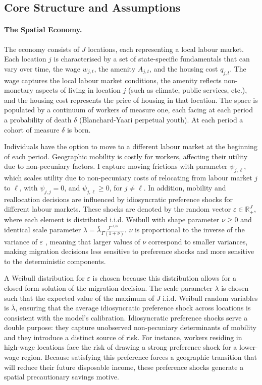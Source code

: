 \documentclass[12pt, a4paper]{article}
\begin{document}
\subsection{Core Structure and Assumptions}
\paragraph{The Spatial Economy.} The economy consists of $J$ locations, each representing a local labour market. Each location $j$ is characterised by a set of state-specific fundamentals that can vary over time, the wage $w_{j,t}$, the amenity $A_{j,t}$, and the housing cost $q_{j,t}$. The wage captures the local labour market conditions, the amenity reflects non-monetary aspects of living in location $j$ (such as climate, public services, etc.), and the housing cost represents the price of housing in that location. The space is populated by a continuum of workers of measure one, each facing at each period a probability of death $\delta$ (Blanchard-Yaari perpetual youth). At each period a cohort of measure $\delta$ is born. 

Individuals have the option to move to a different labour market at the beginning of each period. Geographic mobility is costly for workers, affecting their utility due to non-pecuniary factors. I capture moving frictions with parameter $\psi_{j,\ell}$, which scales utility due to non-pecuniary costs of relocating from labour market $j$ to $\ell$, with  $\psi_{j,j} = 0$, and  $\psi_{j,\ell} \geq 0$, for $j \neq \ell$. In addition, mobility and reallocation decisions are influenced by idiosyncratic preference shocks for different labour markets. These shocks are denoted by the random vector $\varepsilon \in \mathbb{R}^J_+$, where each element is distributed i.i.d. Weibull with shape parameter $\nu \geq 0$ and identical scale parameter $\lambda = \bar{\lambda}\frac{J^{-1/\nu}}{\Gamma(1+\nu)}$. $\nu$ is proportional to the inverse of the variance of $\varepsilon$ , meaning that larger values of $\nu$ correspond to smaller variances, making migration decisions less sensitive to preference shocks and more sensitive to the deterministic components.

A Weibull distribution for $\varepsilon$ is chosen because this distribution allows for a closed-form solution of the migration decision. The scale parameter $\lambda$ is chosen such that the expected value of the maximum of $J$ i.i.d. Weibull random variables is $\bar{\lambda}$, ensuring that the average idiosyncratic preference shock across locations is consistent with the model's calibration. Idiosyncratic preference shocks serve a double purpose: they capture unobserved non-pecuniary determinants of mobility and they introduce a distinct source of risk. For instance, workers residing in high-wage locations face the risk of drawing a strong preference shock for a lower-wage region. Because satisfying this preference forces a geographic transition that will reduce their future disposable income, these preference shocks generate a spatial precautionary savings motive.
\end{document}
